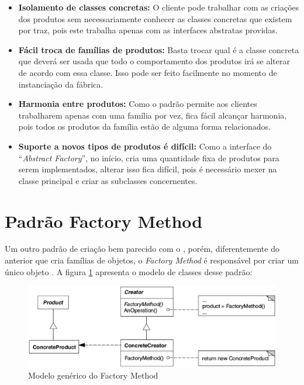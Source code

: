 \begin{apendicesenv}
\begin{itemize}
	\item \textbf{Isolamento de classes concretas:} O cliente pode trabalhar com as criações dos produtos sem necessariamente conhecer as classes concretas que existem por traz, pois este trabalha apenas com as interfaces abstratas providas.
	\item \textbf{Fácil troca de famílias de produtos:} Basta trocar qual é a classe concreta que deverá ser usada que todo o comportamento dos produtos irá se alterar de acordo com essa classe. Isso pode ser feito facilmente no momento de instanciação da fábrica.
	\item \textbf{Harmonia entre produtos:} Como o padrão permite aos clientes trabalharem apenas com uma família por vez, fica fácil alcançar harmonia, pois todos os produtos da família estão de alguma forma relacionados.
	\item \textbf{Suporte a novos tipos de produtos é difícil:} Como a interface do ``\textit{Abstract Factory}'', no início, cria uma quantidade fixa de produtos para serem implementados, alterar isso fica difícil, pois é necessário mexer na classe principal e criar as subclasses concernentes.
\end{itemize}

\section{Padrão Factory Method}
\label{sec:padrao_factory_method}

Um outro padrão de criação bem parecido com o , porém, diferentemente do anterior que cria famílias de objetos, o \textit{Factory Method} é responsável por criar um único objeto \cite{Gamma:1995}. A figura \ref{factory_method} apresenta o modelo de classes desse padrão:

\newpage
\begin{figure}[!h]
	\centering
	\includegraphics[scale=0.5]{figuras/apendices/factory_method.eps}
	\caption[Modelo genérico do Factory Method]{Modelo genérico do Factory Method \cite{Gamma:1995}}
	\label{factory_method}
\end{figure}


\end{apendicesenv}
